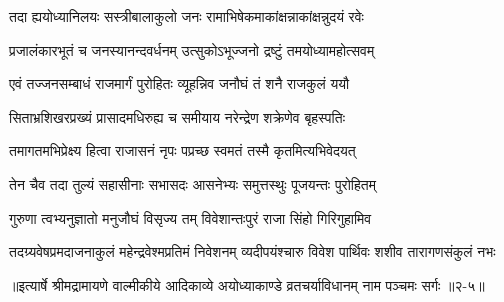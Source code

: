\twolineshloka
{तदा ह्ययोध्यानिलयः सस्त्रीबालाकुलो जनः}
{रामाभिषेकमाकांक्षन्नाकांक्षन्नुदयं रवेः} %

\twolineshloka
{प्रजालंकारभूतं च जनस्यानन्दवर्धनम्}
{उत्सुकोऽभूज्जनो द्रष्टुं तमयोध्यामहोत्सवम्} %

\twolineshloka
{एवं तज्जनसम्बाधं राजमार्गं पुरोहितः}
{व्यूहन्निव जनौघं तं शनै राजकुलं ययौ} %

\twolineshloka
{सिताभ्रशिखरप्रख्यं प्रासादमधिरुह्य च}
{समीयाय नरेन्द्रेण शक्रेणेव बृहस्पतिः} %

\twolineshloka
{तमागतमभिप्रेक्ष्य हित्वा राजासनं नृपः}
{पप्रच्छ स्वमतं तस्मै कृतमित्यभिवेदयत्} %

\twolineshloka
{तेन चैव तदा तुल्यं सहासीनाः सभासदः}
{आसनेभ्यः समुत्तस्थुः पूजयन्तः पुरोहितम्} %

\twolineshloka
{गुरुणा त्वभ्यनुज्ञातो मनुजौघं विसृज्य तम्}
{विवेशान्तःपुरं राजा सिंहो गिरिगुहामिव} %

\twolineshloka
{तदग्र्यवेषप्रमदाजनाकुलं महेन्द्रवेश्मप्रतिमं निवेशनम्}
{व्यदीपयंश्चारु विवेश पार्थिवः शशीव तारागणसंकुलं नभः} %


॥इत्यार्षे श्रीमद्रामायणे वाल्मीकीये आदिकाव्ये अयोध्याकाण्डे व्रतचर्याविधानम् नाम पञ्चमः सर्गः ॥२-५॥
